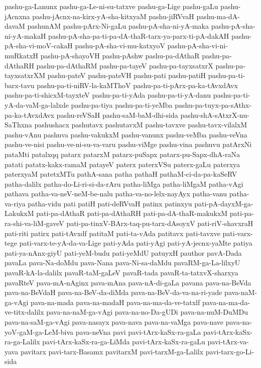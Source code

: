 {pashu-ga-Lanunx
pashu-ga-Le-ni-su-tatxve
pashu-ga-Lige
pashu-gaLu
pashu-jAcnxna
pashu-jAcnx-na-kirx-yA-sha-kitxyaM
pashu-jiRVvaH
pashu-ma-dA-davaM
pashunAM
pashu-pArx-Ni-gaLu
pashu-pA-sha-ni-yA-maka
pashu-pA-sha-ni-yA-makaH
pashu-pA-sha-pa-ti-pa-dA-thaR-tarx-ya-parx-ti-pA-dakAH
pashu-pA-sha-vi-moV-cakaH
pashu-pA-sha-vi-mu-katxyoV
pashu-pA-sha-vi-ni-muRkatxH
pashu-pA-shayoVH
pashu-pAshw
pashu-pa-dAthaR
pashu-pa-dAthaRH
pashu-pa-dAthaRM
pashu-pa-tayeV
pashu-pa-tayxsatxrX
pashu-pa-tayxsatxrXM
pashu-pateV
pashu-pateVH
pashu-pati
pashu-patiH
pashu-pa-ti-barx-tavu
pashu-pa-ti-niRV-la-kaMThoV
pashu-pa-ti-pArx-pa-ka-tAvxdAvx
pashu-pa-ti-shicxM-tayxteV
pashu-pa-ti-yAda
pashu-pa-ti-yA-danu
pashu-pa-ti-yA-da-vaM-ga-lalxde
pashu-pa-tiya
pashu-pa-ti-yeMba
pashu-pa-tuyx-pa-sAthx-pa-ka-tAvxdAvx
pashu-reVSaH
pashu-saM-baM-dhi-sida
pashu-shA-sAtxrX-nu-SaThxna
pashushacx
pashutavx
pashutavxM
pashu-tavxve
pashu-tavx-vilalxM
pashu-vAnu
pashuva
pashu-vakukxM
pashu-vanunx
pashu-veMba
pashu-veVna
pashu-ve-nisi
pashu-ve-ni-su-va-varu
pashu-viMge
pashu-vina
pashuvu
patArxNi
pataMti
patalxqq
patarx
patarxM
patarx-puSapx
patarx-pu-Sapx-dhA-raNa
patati
patatx-kakx-ramaM
patayeV
paterx
paterxVSu
paterx-gaLu
paterxya
paterxyaM
patetxMTu
pathA-sana
patha
pathaH
pathaM-ci-da-pa-kaSeRV
patha-dalilx
patha-do-Li-ri-si-da-rAru
patha-liMga
patha-liMgaM
patha-vAgi
pathava
patha-va-neV-neM-be-nalu
patha-va-no-lelx-nayAyx
patha-vanu
patha-va-riya
patha-vidu
pati
patiH
pati-deRVvaH
patinx
patinxyu
pati-pA-dayxM-ga-LakukxM
pati-pa-dAthaR
pati-pa-dAthaRH
pati-pa-dA-thaR-makukxM
pati-pa-ra-shi-va-liM-gaveV
pati-pa-tinxV-BArx-taq-pu-tarx-dAsoyxV
pati-riV-shavxraH
pati-riti
patirx
pati-tAvxdf
patitaM
pati-ta-vAda
patitavx
pati-tavxve
pati-varx-tege
pati-varx-te-yA-da-va-Lige
pati-yAda
pati-yAgi
pati-yA-jecnx-yaMte
patiya
pati-ya-nAnx-giyU
pati-yeM-budu
pati-yeMdU
patuyxH
pauthor
pavA-Dada
pavaLa
pava-Na-doMdu
pava-Nana
pava-Ni-sa-daMdu
pavaRM-ga-La-lilxyU
pavaR-kA-la-dalilx
pavaR-taM-gaLeV
pavaR-tada
pavaR-ta-tatxvX-sharxya
pavaRteV
pava-mA-nAginx
pava-mAna
pava-nA-di-gaLa
pavana
pava-na-BeVda
pava-na-BeVdaH
pava-na-BeV-da-diMda
pava-na-BeV-da-va-na-ri-yade
pava-naM-ga-vAgi
pava-na-mada
pava-na-madaH
pava-na-ma-da-ve-tatxlf
pava-na-ma-da-ve-titx-dalilx
pava-na-naM-ga-vAgi
pava-na-no-Da-gUDi
pava-na-nuM-DuMDu
pava-na-saM-ga-vAgi
pava-nasayx
pava-nava
pava-na-vaMga
pava-nave
pava-na-yoV-gaM-ga-LeM-biva
pava-neVna
pavi
pavi-tArx-kaSx-ra-gaLa
pavi-tArx-kaSx-ra-ga-Lalilx
pavi-tArx-kaSx-ra-ga-LiMda
pavi-tArx-kaSx-ra-gaLu
pavi-tArx-va-yava
pavitarx
pavi-tarx-Basamx
pavitarxM
pavi-tarxM-ga-Lalilx
pavi-tarx-go-Li-sida
}
